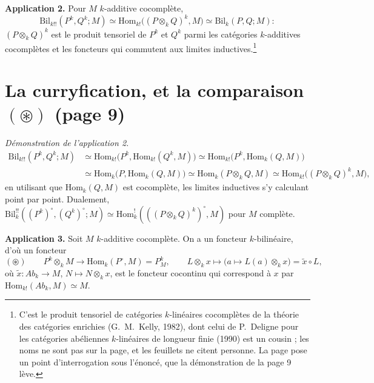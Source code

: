 \documentclass[11pt,a4paper]{article}
\begin{document}
\textbf{Application 2.} Pour $M$ $k$-additive cocomplète,
\[
\mathrm{Bil}_{k!!}(P^{k}, Q^{k}; M) \simeq \mathrm{Hom}_{k!}\bigl((P \otimes_{k}
Q)^{k}, M\bigr) \simeq \mathrm{Bil}_{k}(P, Q; M) :
\]
$(P \otimes_{k} Q)^{k}$ est le produit tensoriel de $P^{k}$ et $Q^{k}$ parmi les
catégories $k$-additives cocomplètes et les foncteurs qui commutent aux limites
inductives.\footnote{C'est le produit tensoriel de catégories $k$-linéaires
cocomplètes de la théorie des catégories enrichies (G.~M.~Kelly, 1982), dont
celui de P.~Deligne pour les catégories abéliennes $k$-linéaires de longueur
finie (1990) est un cousin ; les noms ne sont pas sur la page, et les feuillets
ne citent personne. La page pose un point
d'interrogation sous l'énoncé, que la démonstration de la page 9 lève.}

\section*{La curryfication, et la comparaison $(\circledast)$ (page 9)}

\emph{Démonstration de l'application 2.}
\[
\begin{aligned}
\mathrm{Bil}_{k!!}(P^{k}, Q^{k}; M)
 &\simeq \mathrm{Hom}_{k!}\bigl(P^{k}, \mathrm{Hom}_{k!}(Q^{k}, M)\bigr)
  \simeq \mathrm{Hom}_{k!}\bigl(P^{k}, \mathrm{Hom}_{k}(Q, M)\bigr) \\
 &\simeq \mathrm{Hom}_{k}\bigl(P, \mathrm{Hom}_{k}(Q, M)\bigr)
  \simeq \mathrm{Hom}_{k}(P \otimes_{k} Q, M)
  \simeq \mathrm{Hom}_{k!}\bigl((P \otimes_{k} Q)^{k}, M\bigr),
\end{aligned}
\]
en utilisant que $\mathrm{Hom}_{k}(Q, M)$ est cocomplète, les limites
inductives s'y calculant point par point. Dualement,
$\mathrm{Bil}^{!!}_{k}((P^{k})^{\circ}, (Q^{k})^{\circ}; M) \simeq
\mathrm{Hom}^{!}_{k}(((P \otimes_{k} Q)^{k})^{\circ}, M)$ pour $M$ complète.

\textbf{Application 3.} Soit $M$ $k$-additive cocomplète. On a un foncteur
$k$-bilinéaire, d'où un foncteur
\[
(\circledast) \qquad P^{k} \otimes_{k} M \longrightarrow
\mathrm{Hom}_{k}(P^{\circ}, M) = P^{k}_{M},
\qquad
L \otimes_{k} x \longmapsto \bigl(a \mapsto L(a) \otimes_{k} x\bigr) =
\widetilde{x} \circ L,
\]
où $\widetilde{x} : Ab_{k} \to M$, $N \mapsto N \otimes_{k} x$, est le foncteur
cocontinu qui correspond à $x$ par $\mathrm{Hom}_{k!}(Ab_{k}, M) \simeq M$.
\end{document}
